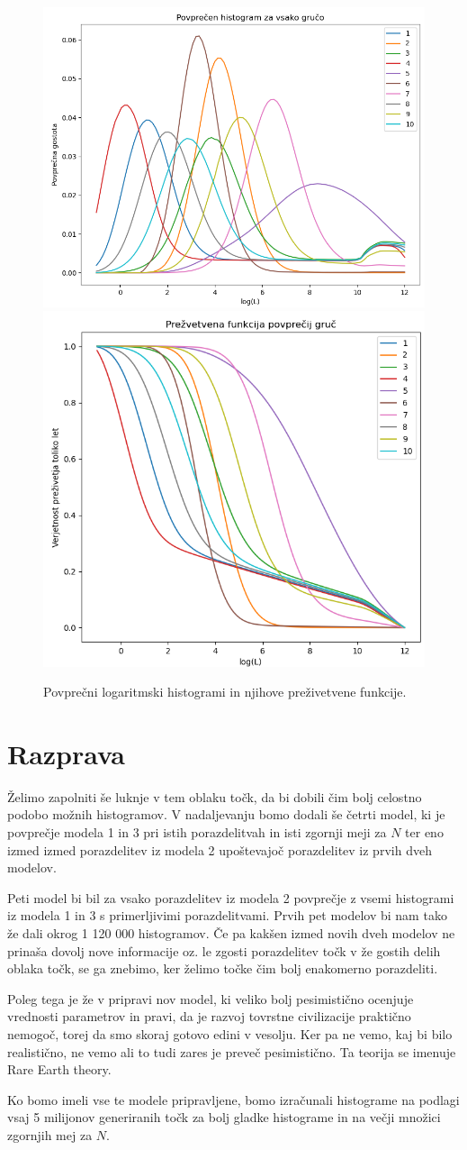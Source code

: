 \documentclass[a4paper]{IEEEtran}
\begin{document}
\begin{figure}
	\centering
	\includegraphics[width=0.49\linewidth]{Figures/log10mean} \includegraphics[width=0.49\linewidth]{Figures/log10surv}
	\caption{Povprečni logaritmski histogrami in njihove preživetvene funkcije.}
	\label{fig:log10clust}
\end{figure}

\section{Razprava}

Želimo zapolniti še luknje v tem oblaku točk, da bi dobili čim bolj celostno podobo možnih histogramov. V nadaljevanju bomo dodali še četrti model, ki je povprečje modela 1 in 3 pri istih porazdelitvah in isti zgornji meji za $N$ ter eno izmed izmed porazdelitev iz modela 2 upoštevajoč porazdelitev iz prvih dveh modelov.

Peti model bi bil za vsako porazdelitev iz modela 2 povprečje z vsemi histogrami iz modela 1 in 3 s primerljivimi porazdelitvami. Prvih pet modelov bi nam tako že dali okrog 1 120 000 histogramov. Če pa kakšen izmed novih dveh modelov ne prinaša dovolj nove informacije oz. le zgosti porazdelitev točk v že gostih delih oblaka točk, se ga znebimo, ker želimo točke čim bolj enakomerno porazdeliti.

Poleg tega je že v pripravi nov model, ki veliko bolj pesimistično ocenjuje vrednosti parametrov in pravi, da je razvoj tovrstne civilizacije praktično nemogoč, torej da smo skoraj gotovo edini v vesolju. Ker pa ne vemo, kaj bi bilo realistično, ne vemo ali to tudi zares je preveč pesimistično. Ta teorija se imenuje Rare Earth theory.

Ko bomo imeli vse te modele pripravljene, bomo izračunali histograme na podlagi vsaj 5 milijonov generiranih točk za bolj gladke histograme in na večji množici zgornjih mej za $N$.
\end{document}
